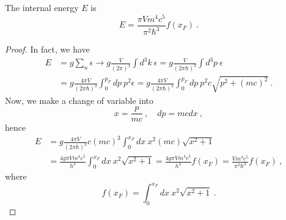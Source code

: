     The internal energy $E$ is 
    \begin{equation*}
        E = \frac{\pi V m^4 c^5}{\pi^2 \hbar^3} f(x_F) ~.
    \end{equation*}
    \begin{proof}
        In fact, we have
        \begin{equation*}
        \begin{aligned}
            E & = g \sum_{n} \epsilon \rightarrow g \frac{V}{(2\pi)^3} \int d^3 k ~ \epsilon = g \frac{V}{(2\pi \hbar)^3} \int d^3 p ~ \epsilon \\ & = g \frac{4 \pi V}{(2\pi \hbar)^3} \int_0^{p_F} dp ~ p^2 \epsilon = g \frac{4 \pi V}{(2\pi \hbar)^3} \int_0^{p_F} dp ~ p^2 c \sqrt{p^2 + (mc)^2} ~.
        \end{aligned}
        \end{equation*}
        Now, we make a change of variable into
        \begin{equation*}
            x = \frac{p}{mc} ~, \quad dp = mc dx ~,
        \end{equation*}
        hence 
        \begin{equation*}
        \begin{aligned}
            E & = g \frac{4 \pi V}{(2\pi \hbar)^3} c (mc)^3 \int_0^{x_F} dx ~ x^2 (mc)\sqrt{x^2 + 1} \\ & =  \frac{4 g \pi V m^4 c^5}{h^3} \int_0^{x_F} dx ~ x^2\sqrt{x^2 + 1} = \frac{4 g \pi V m^4 c^5}{h^3} f(x_F) = \frac{V m^4 c^5}{\pi^2 \hbar^3} f(x_F) ~,
        \end{aligned}
        \end{equation*}
        where 
        \begin{equation*}
            f(x_F) = \int_0^{x_F} dx ~ x^2 \sqrt{x^2 + 1} ~.
        \end{equation*}
    \end{proof}

